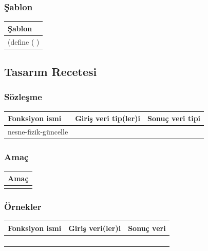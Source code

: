 \documentclass[12pt, a4paper]{article}
\newcommand\fillin[1][3cm]{\makebox[#1]{\dotfill}}
\begin{document}
\subsubsection*{Şablon}
\begin{tabular}{| p{17cm} |  }
\hline			
Şablon\\
\hline
\vspace{0,2cm}
(define (\fillin[2cm] \hspace{1cm}  \fillin[8cm] ) \\[30ex]
\hline  
\end{tabular}





\newpage
\subsection*{Tasarım Recetesi}
\subsubsection*{Sözleşme}
\begin{tabular}{| p{4cm} | p{8cm} | p{4cm} |  }
\hline			
Fonksiyon ismi&Giriş veri tip(ler)i&Sonuç veri tipi\\
\hline
nesne-fizik-güncelle& & \\[10ex]
\hline  
\end{tabular}

\subsubsection*{Amaç}
\begin{tabular}{| p{17cm} |  }
\hline			
Amaç\\
\hline
 \\[10ex]
\hline  
\end{tabular}

\subsubsection*{Örnekler}
\begin{tabular}{| p{4cm} | p{8cm} | p{4cm} |  }
\hline			
Fonksiyon ismi&Giriş veri(ler)i&Sonuç veri\\
\hline
& & \\[6ex]
\hline  
& & \\[6ex]
\hline  
& & \\[6ex]
\hline  
& & \\[6ex]
\hline  
\end{tabular}
\end{document}
